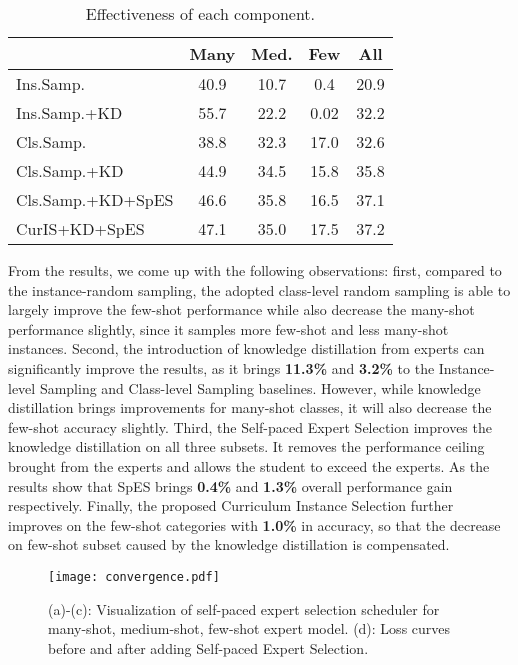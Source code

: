 \documentclass[runningheads]{llncs}
\begin{document}
	\begin{wraptable}{r}{7cm}
		\caption{Effectiveness of each component.}
		\label{table:ablation}
		\begin{tabular}{l|c|c|c|c}
			\hline
			\diagbox{Method}{Accuracy} &  Many & Med. & Few & All  \\
			\hline\hline
			Ins.Samp. & 40.9 & 10.7 & 0.4 & 20.9 \\
			
			Ins.Samp.+KD &  55.7 & 22.2 & 0.02 & 32.2 \\
			


			Cls.Samp. & 38.8 & 32.3 & 17.0 & 32.6 \\
			
			Cls.Samp.+KD & 44.9 & 34.5 & 15.8 & 35.8 \\
			
			Cls.Samp.+KD+SpES & 46.6 & 35.8 & 16.5 & 37.1 \\
			
			CurIS+KD+SpES & 47.1 & 35.0 & 17.5 & 37.2 \\
			\hline
		\end{tabular}
	\end{wraptable}
	From the results, we come up with the following observations: first, compared to the instance-random sampling, the adopted class-level random sampling is able to largely improve the few-shot performance while also decrease the many-shot performance slightly, since it samples more few-shot and less many-shot instances. Second, the introduction of knowledge distillation from experts can significantly improve the results, as it brings \textbf{11.3\%} and \textbf{3.2\%} to the Instance-level Sampling and Class-level Sampling baselines. However, while knowledge distillation brings improvements for many-shot classes, it will also decrease the few-shot accuracy slightly.  Third, the Self-paced Expert Selection improves the knowledge distillation on all three subsets. It removes the performance ceiling brought from the experts and allows the student to exceed the experts. As the results show that SpES brings \textbf{0.4\%} and \textbf{1.3\%} overall performance gain respectively. Finally, the proposed Curriculum Instance Selection further improves on the few-shot categories with \textbf{1.0\%} in accuracy, so that the decrease on few-shot subset caused by the knowledge distillation is compensated.
	
	


	
	\begin{figure}[htbp!]
		\centering
		\texttt{[image: convergence.pdf]}
		\caption{(a)-(c): Visualization of self-paced expert selection scheduler  for many-shot, medium-shot, few-shot expert model. (d): Loss curves before and after adding Self-paced Expert Selection.}
		\label{fig:SpES}
	\end{figure}
	
\end{document}
